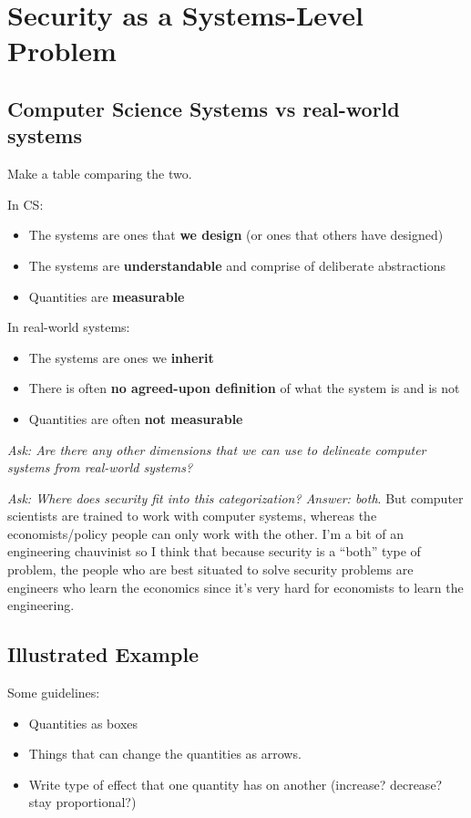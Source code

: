 \documentclass[11pt]{article}
\begin{document}
\section{Security as a Systems-Level Problem}

\subsection{Computer Science Systems vs real-world systems}

Make a table comparing the two.

In CS:
\begin{itemize}
    \item The systems are ones that {\bf we design} (or ones that others have designed)
    \item The systems are {\bf understandable} and comprise of deliberate abstractions
    \item Quantities are {\bf measurable}
\end{itemize}

In real-world systems:
\begin{itemize}
    \item The systems are ones we {\bf inherit}
    \item There is often {\bf no agreed-upon definition} of what the system is and is not
    \item Quantities are often {\bf not measurable}
\end{itemize}

{\it Ask: Are there any other dimensions that we can use to delineate computer systems from real-world systems?}

{\it Ask: Where does security fit into this categorization? Answer: both}. But computer scientists are trained to work with computer systems, whereas the economists/policy people can only work with the other. I'm a bit of an engineering chauvinist so I think that because security is a ``both'' type of problem, the people who are best situated to solve security problems are engineers who learn the economics since it's very hard for economists to learn the engineering.

\subsection{Illustrated Example}
Some guidelines:
\begin{itemize}
    \item Quantities as boxes
    \item Things that can change the quantities as arrows.
    \item Write type of effect that one quantity has on another (increase? decrease? stay proportional?)
\end{itemize}
\end{document}
